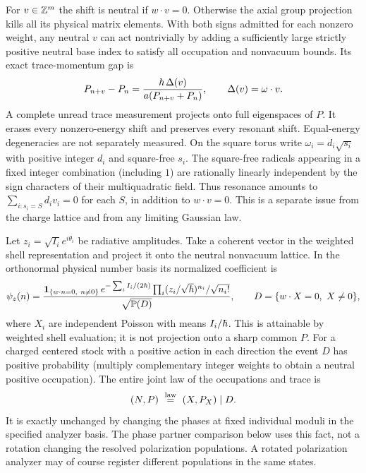 For \(v\in\mathbb Z^m\) the shift is neutral if \(w\cdot v=0\). Otherwise the axial group projection kills all its physical matrix elements. With both signs admitted for each nonzero weight, any neutral \(v\) can act nontrivially by adding a sufficiently large strictly positive neutral base index to satisfy all occupation and nonvacuum bounds. Its exact trace-momentum gap is
\begin{equation}\label{eq:gap}
  P_{n+v}-P_n
     =\frac{\hbar\,\Delta(v)}{a(P_{n+v}+P_n)},\qquad
    \Delta(v)=\omega\cdot v .
\end{equation}
A complete unread trace measurement projects onto full eigenspaces of \(P\). It erases every nonzero-energy shift and preserves every resonant shift. Equal-energy degeneracies are not separately measured. On the square torus write \(\omega_i=d_i\sqrt{s_i}\) with positive integer \(d_i\) and square-free \(s_i\). The square-free radicals appearing in a fixed integer combination (including \(1\)) are rationally linearly independent by the sign characters of their multiquadratic field. Thus resonance amounts to \(\sum_{i:s_i=S}d_i v_i=0\) for each \(S\), in addition to \(w\cdot v=0\). This is a separate issue from the charge lattice and from any limiting Gaussian law.

Let \(z_i=\sqrt{I_i}e^{i\theta_i}\) be radiative amplitudes. Take a coherent vector in the weighted shell representation and project it onto the neutral nonvacuum lattice. In the orthonormal physical number basis its normalized coefficient is
\begin{equation}\label{eq:coherent}
 \psi_z(n)=
 \frac{\mathbf 1_{\{w\cdot n=0,\ n\ne0\}}\,
       e^{-\sum_i I_i/(2\hbar)}
       \prod_i(z_i/\sqrt{\hbar})^{n_i}/\sqrt{n_i!}}
      {\sqrt{\mathbb P(D)}},\qquad
 D=\{w\cdot X=0,\ X\ne0\},
\end{equation}
where \(X_i\) are independent Poisson with means \(I_i/\hbar\). This is attainable by weighted shell evaluation; it is not projection onto a sharp common \(P\). For a charged centered stock with a positive action in each direction the event \(D\) has positive probability (multiply complementary integer weights to obtain a neutral positive occupation). The entire joint law of the occupations and trace is
\[
            (N,P) \ \stackrel{\rm law}{=}\ (X,P_X)\mid D .
\]
It is exactly unchanged by changing the phases at fixed individual moduli in the specified analyzer basis. The phase partner comparison below uses this fact, not a rotation changing the resolved polarization populations. A rotated polarization analyzer may of course register different populations in the same states.

